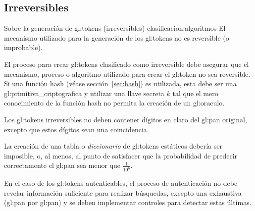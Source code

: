 %
%

\subsection{Irreversibles}

\requerimientoConClasificacion
{Sobre la generación de \glspl{gl:token} (irreversibles)}
{clasificacion:algoritmos}
{
  El mecanismo utilizado para la generación de los \glspl{gl:token}
  no es reversible (o improbable).
}

{
  El proceso para crear \glspl{gl:token} clasificado como irreversible
  debe asegurar que el mecanismo, proceso o algoritmo utilizado para
  crear el \gls{gl:token} no sea reversible. Si una función hash (véase
  sección~\ref{sec:hash}) es utilizada, esta debe ser una
  \gls{gl:primitiva_criptografica} y utilizar una llave secreta $k$ tal que
  el mero conocimiento de la función hash no permita la creación de un
  \gls{gl:oraculo}.
}

{
  Los \glspl{gl:token} irreversibles no deben contener dígitos en claro del
  \gls{gl:pan} original, excepto que estos dígitos sean una coincidencia.
}

{
  La creación de una tabla o \textit{diccionario} de \glspl{gl:token}
  estáticos debería ser imposible, o, al menos, al punto de satisfacer que
  la probabilidad de predecir correctamente el \gls{gl:pan} sea menor que
  $\frac{1}{10^6}$.
}

{
  En el caso de los \glspl{gl:token} autenticables, el proceso de
  autenticación no debe revelar información suficiente para realizar
  búsquedas, excepto una exhaustiva (\gls{gl:pan} por \gls{gl:pan}) y se
  deben implementar controles para detectar estas últimas.
}

